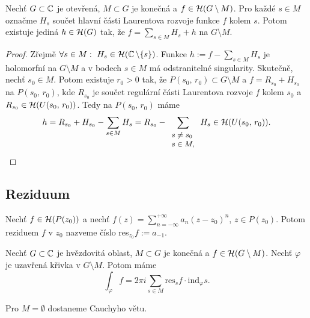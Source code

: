 \begin{theorem}
Nechť $G \subset \operatorname{\mathbb{C}} $ je otevřená, $M \subset G$ je konečná a $f \in \operatorname{\mathcal{H}} (G \setminus M)$. Pro každé $s \in M$ označme $H_s$ součet hlavní části Laurentova rozvoje funkce $f$ kolem $s$. Potom existuje jediná $h \in \operatorname{\mathcal{H}} (G)$ tak, že $f=\sum\limits_{s\in M} H_s+h$ na $G \setminus M$.
\end{theorem}
\begin{proof}
Zřejmě $\forall s \in M:\ H_s \in \Holo (\Comp  \setminus \{s \})$. Funkce $h:=f-\sum\limits_{s\in M} H_s$ je holomorfní na $G \setminus M$ a v bodech $s \in M$ má odstranitelné singularity. Skutečně, nechť $s_0 \in M$. Potom existuje $r_0>0$ tak, že $P(s_0,\,r_0) \subset G \setminus M$ a $f=R_{s_0}+H_{s_0}$ na $P(s_0,\,r_0)$, kde $R_{s_0}$ je součet regulární části Laurentova rozvoje $f$ kolem $s_0$ a $R_{s_0}\in \operatorname{\mathcal{H}} (U(s_0,\,r_0))$. Tedy na $P(s_0,\,r_0)$ máme
$$h=R_{s_0}+H_{s_0}-\sum\limits_{s\in M} H_s=R_{s_0}-\sum\limits_{
\small{\begin{array}l
s \neq s_0\\
s\in M,
\end{array}}}
H_s \in \Holo (U(s_0,\,r_0)).$$
\end{proof}

\subsection{Reziduum}
\begin{definition}
Nechť $f \in \operatorname{\mathcal{H}} (P(z_0))$ a nechť $f(z)=\sum\limits_{n=-\infty}^{+\infty}a_n(z-z_0)^n$, $z\in P(z_0)$. Potom reziduem $f$ v $z_0$ nazveme číslo res$_{z_0}f:=a_{-1}$.
\end{definition}

\begin{theorem}
Nechť $G \subset \operatorname{\mathbb{C}} $ je hvězdovitá oblast, $M \subset G$ je konečná a $f \in \operatorname{\mathcal{H}} (G \setminus M)$. Nechť $\varphi$ je uzavřená křivka v $G \setminus M$. Potom máme 
\begin{equation}
    \int_\varphi f=2\pi i \sum\limits_{s\in M}\text{res}_sf \cdot \text{ind}_\varphi s.
    \tag{RV}
    \label{eqn:7.31.RV}
\end{equation}
\end{theorem}

\begin{note*}
Pro $M=\emptyset$ dostaneme Cauchyho větu.
\end{note*}

